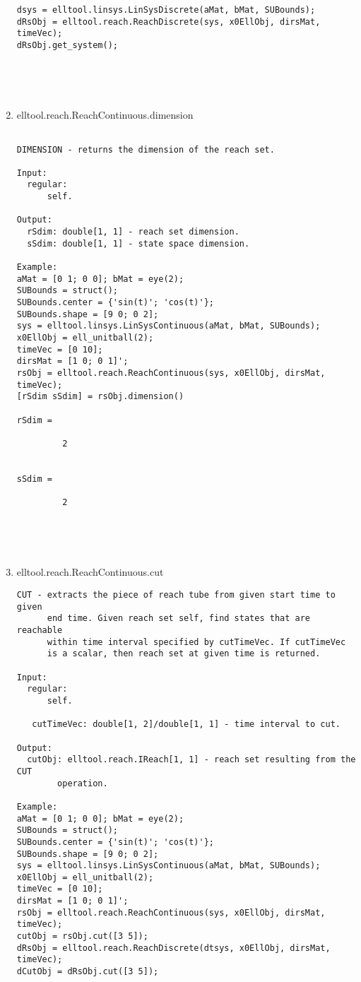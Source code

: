 \begin{enumerate}
\begin{lstlisting}
dsys = elltool.linsys.LinSysDiscrete(aMat, bMat, SUBounds);
dRsObj = elltool.reach.ReachDiscrete(sys, x0EllObj, dirsMat, timeVec);
dRsObj.get_system();





\end{lstlisting}
\fontfamily{\familydefault}
\selectfont
\item {elltool.reach.ReachContinuous.dimension}
\selectfont
\begin{lstlisting}

DIMENSION - returns the dimension of the reach set.

Input:
  regular:
      self.

Output:
  rSdim: double[1, 1] - reach set dimension.
  sSdim: double[1, 1] - state space dimension.

Example:
aMat = [0 1; 0 0]; bMat = eye(2);
SUBounds = struct();
SUBounds.center = {'sin(t)'; 'cos(t)'};
SUBounds.shape = [9 0; 0 2];
sys = elltool.linsys.LinSysContinuous(aMat, bMat, SUBounds);
x0EllObj = ell_unitball(2);
timeVec = [0 10];
dirsMat = [1 0; 0 1]';
rsObj = elltool.reach.ReachContinuous(sys, x0EllObj, dirsMat, timeVec);
[rSdim sSdim] = rsObj.dimension()

rSdim =

         2


sSdim =

         2





\end{lstlisting}
\fontfamily{\familydefault}
\selectfont
\item {elltool.reach.ReachContinuous.cut}
\selectfont
\begin{lstlisting}
CUT - extracts the piece of reach tube from given start time to given
      end time. Given reach set self, find states that are reachable
      within time interval specified by cutTimeVec. If cutTimeVec
      is a scalar, then reach set at given time is returned.

Input:
  regular:
      self.

   cutTimeVec: double[1, 2]/double[1, 1] - time interval to cut.

Output:
  cutObj: elltool.reach.IReach[1, 1] - reach set resulting from the CUT
        operation.

Example:
aMat = [0 1; 0 0]; bMat = eye(2);
SUBounds = struct();
SUBounds.center = {'sin(t)'; 'cos(t)'};
SUBounds.shape = [9 0; 0 2];
sys = elltool.linsys.LinSysContinuous(aMat, bMat, SUBounds);
x0EllObj = ell_unitball(2);
timeVec = [0 10];
dirsMat = [1 0; 0 1]';
rsObj = elltool.reach.ReachContinuous(sys, x0EllObj, dirsMat, timeVec);
cutObj = rsObj.cut([3 5]);
dRsObj = elltool.reach.ReachDiscrete(dtsys, x0EllObj, dirsMat, timeVec);
dCutObj = dRsObj.cut([3 5]);






\end{lstlisting}
\end{enumerate}

